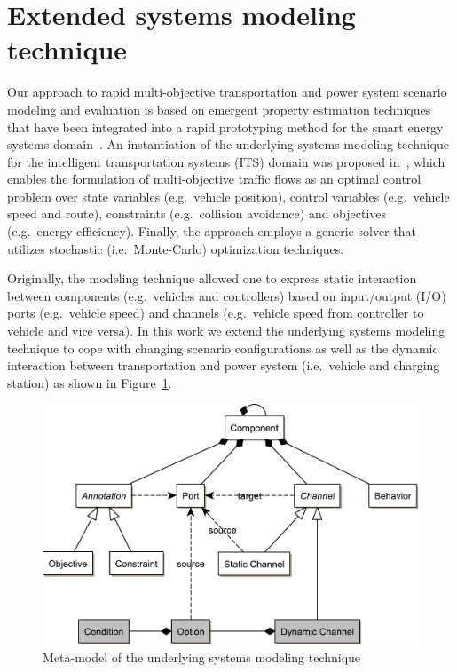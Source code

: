 \section{Extended systems modeling technique}
\label{section:foundation}

Our approach to rapid multi-objective transportation and power system scenario modeling and evaluation is based on emergent property estimation techniques \cite{hackenberg2012towards} that have been integrated into a rapid prototyping method for the smart energy systems domain~\cite{hackenberg2014rapid}. An instantiation of the underlying systems modeling technique for the intelligent transportation systems (ITS) domain was proposed in~\cite{ascher2014early}, which enables the formulation of multi-objective traffic flows as an optimal control problem over state variables (e.g.\ vehicle position), control variables (e.g.\ vehicle speed and route), constraints (e.g.\ collision avoidance) and objectives (e.g.\ energy efficiency). Finally, the approach employs a generic solver that utilizes stochastic (i.e.\ Monte-Carlo) optimization techniques.

Originally, the modeling technique allowed one to express static interaction between components (e.g.\ vehicles and controllers) based on input/output (I/O) ports (e.g.\ vehicle speed) and channels (e.g.\ vehicle speed from controller to vehicle and vice versa). In this work we extend the underlying systems modeling technique to cope with changing scenario configurations as well as the dynamic interaction between transportation and power system (i.e.\ vehicle and charging station) as shown in Figure~\ref{fig:meta_model}.

\begin{figure}[h]
	\centering
	\includegraphics[width=\columnwidth]{../gfx/meta_model.pdf}
	\caption{Meta-model of the underlying systems modeling technique}%
	\label{fig:meta_model}
\end{figure}

